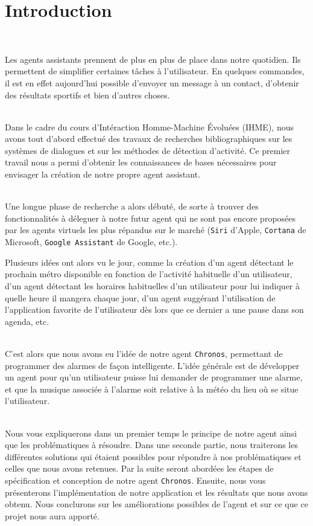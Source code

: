 \chapter*{Introduction}
\thispagestyle{plain}
~\\[1cm]
{ \large

Les agents assistants prennent de plus en plus de place dans notre quotidien.  Ils permettent de simplifier certaines tâches à l'utilisateur. En quelques  commandes, il est en effet aujourd'hui possible d'envoyer un message à un contact, d'obtenir des résultats sportifs et bien d'autres choses.

~\\\indent
Dans le cadre du cours d'\textsf{Intéraction Homme-Machine \'Evoluées} (\textsf{IHME}), nous avons tout d'abord effectué des travaux de recherches bibliographiques sur les systèmes de dialogues et sur les méthodes de détection d'activité. Ce premier  travail nous a permi d'obtenir les connaissances de bases nécessaires pour envisager la création de notre propre agent assistant.

~\\\indent
Une longue phase de recherche a alors débuté, de sorte à trouver des fonctionnalités à déleguer à notre futur agent qui ne sont pas encore proposées par les agents virtuels les plus répandus sur le marché (\og \texttt{Siri} \fg{} d'Apple, \og \texttt{Cortana} \fg{} de Microsoft, \og \texttt{Google Assistant} \fg{} de Google, etc.).

Plusieurs idées ont alors vu le jour, comme la création d'un agent détectant le prochain métro disponible en fonction de l'activité habituelle d'un utilisateur, d'un agent détectant les horaires habituelles d'un utilisateur pour lui indiquer à quelle heure il mangera chaque jour, d'un agent suggérant l'utilisation de l'application favorite de l'utilisateur dès lors que ce dernier a une pause dans son agenda, etc.

~\\\indent
C'est alors que nous avons eu l'idée de notre agent \texttt{Chronos}, permettant de programmer des alarmes de façon intelligente. L'idée générale est de développer un agent pour qu'un utilisateur puisse lui demander de programmer une alarme, et que la musique associée à l'alarme soit relative à la météo du lieu où se situe l'utilisateur.

~\\\indent
Nous vous expliquerons dans un premier temps le principe de notre agent ainsi que les problématiques à résoudre. Dans une seconde partie, nous traiterons les différentes solutions qui étaient possibles pour répondre à nos problématiques et celles que nous avons retenues. Par la suite seront abordées les étapes de spécification et conception de notre agent \texttt{Chronos}. Ensuite, nous vous présenterons l'implémentation de notre application et les résultats que nous avons obtenu. Nous conclurons sur les améliorations possibles de l'agent et sur ce que ce projet nous aura apporté.


}

